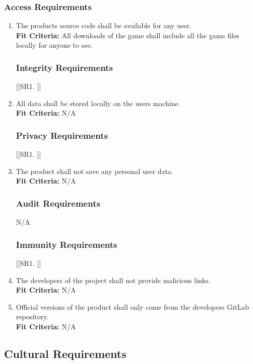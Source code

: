 \documentclass[12pt, titlepage]{article}
\begin{document}
\subsubsection{Access Requirements}
\begin{enumerate}[{SR}1. ]
    \item The products source code shall be available for any user.\\
    \textbf{Fit Criteria:} All downloads of the game shall include all the game files locally for anyone to see.

\subsubsection{Integrity Requirements}
[{[{SR}1. ]}]
    \item All data shall be stored locally on the users machine.\\
    \textbf{Fit Criteria:} N/A

\subsubsection{Privacy Requirements}
[{[{SR}1. ]}]
    \item The product shall not save any personal user data.\\
    \textbf{Fit Criteria:} N/A

\subsubsection{Audit Requirements}
N/A

\subsubsection{Immunity Requirements}
[{[{SR}1. ]}]
    \item The developers of the project shall not provide malicious links.\\
    \textbf{Fit Criteria:} N/A
    \item Official versions of the product shall only come from the developers GitLab repository.\\
    \textbf{Fit Criteria:} N/A
\end{enumerate}



\subsection{Cultural Requirements}
\end{document}
